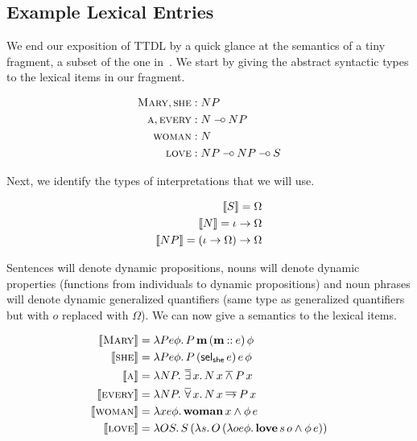 \subsection{Example Lexical Entries}
\label{ttdl-lexicon}

We end our exposition of TTDL by a quick glance at the semantics of a tiny
fragment, a subset of the one in~\cite{de2006towards}. We start by giving
the abstract syntactic types to the lexical items in our fragment.

\begin{align*}
  \textsc{Mary}, \textsc{she} &: NP \\
  \textsc{a}, \textsc{every} &: N \mathbin{{-}\mkern-3.5mu{\circ}} NP \\
  \textsc{woman} &: N \\
  \textsc{love} &: NP \mathbin{{-}\mkern-3.5mu{\circ}} NP \mathbin{{-}\mkern-3.5mu{\circ}} S
\end{align*}

Next, we identify the types of interpretations that we will use.

\begin{align*}
  \llbracket S \rrbracket = \Omega \\
  \llbracket N \rrbracket = \iota \to \Omega \\
  \llbracket NP \rrbracket = (\iota \to \Omega) \to \Omega
\end{align*}

Sentences will denote dynamic propositions, nouns will denote dynamic
properties (functions from individuals to dynamic propositions) and noun
phrases will denote dynamic generalized quantifiers (same type as
generalized quantifiers but with $o$ replaced with $\Omega$). We can now
give a semantics to the lexical items.

\begin{align*}
  \llbracket \textsc{Mary} \rrbracket &= \lambda P e \phi.\, P\,\textbf{m}\,(\textbf{m} \mathbin{::} e)\,\phi \\
  \llbracket \textsc{she} \rrbracket &= \lambda P e \phi.\, P\,(\textsf{sel}_{\textsf{she}}\,e)\,e\,\phi \\
  \llbracket \textsc{a} \rrbracket &= \lambda N P.\, \mathop{\overline{\exists}} x.\, N\,x \mathbin{\overline{\land}} P\,x \\
  \llbracket \textsc{every} \rrbracket &= \lambda N P.\, \mathop{\overline{\forall}} x.\, N\,x \mathbin{\overline{\to}} P\,x \\
  \llbracket \textsc{woman} \rrbracket &= \lambda x e \phi.\, \textbf{woman}\,x \land \phi\,e \\
  \llbracket \textsc{love} \rrbracket &= \lambda O S.\, S\,(\lambda s.\, O\,(\lambda o e \phi.\, \textbf{love}\,s\,o \land \phi\,e))
\end{align*}

